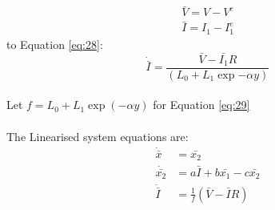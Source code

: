     \begin{align}
        \bar{V} = V - V^e \nonumber \\
        \bar{I} = I_1 - I_1^e \nonumber
    \end{align}
    to Equation \eqref{eq:28}:
    \begin{equation}\label{eq:29}
        \dot{\bar{I}} = \frac{\bar{V} - \bar{I_1}R}{\left(L_{0} + L_{1}\exp{- \alpha y}\right)}
    \end{equation}
    \hfill \break \\
    Let $f = {L_{0} + L_{1}\exp{(- \alpha y)}}$ for Equation \eqref{eq:29}\\
    \hfill \break \\
    The Linearised system equations are: \\
    \begin{align}
        \dot{\bar{x}} &= \bar{x_2} \\
        \dot{\bar{x_2}} &= a\bar{I} + b\bar{x_1} -c\bar{x_2} \\
        \dot{\bar{I}} &= \frac{1}{f}(\bar{V} - \bar{I}R)
    \end{align}